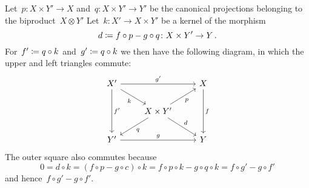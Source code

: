 \section{}

Let~$p \colon X \times Y' \to X$ and~$q \colon X \times Y' \to Y'$ be the canonical projections belonging to the biproduct~$X \otimes Y'$
Let~$k \colon X' \to X \times Y'$ be a kernel of the morphism
\[
            d
  \coloneqq  f \circ p - g \circ q
  \colon    X \times Y'
  \to       Y \,.
\]
For~$f' \coloneqq q \circ k$ and~$g' \coloneqq q \circ k$ we then have the following diagram, in which the upper and left triangles commute:
\[
  \begin{tikzcd}
      X'
      \arrow{rr}[above]{g'}
      \arrow{dr}[below left]{k}
      \arrow{dd}[right]{f'}
    & {}
    & X
      \arrow{dd}[right]{f}
    \\
      {}
    & X \times Y'
      \arrow{ur}[below right]{p}
      \arrow{dr}[above right]{d}
      \arrow{dl}[below right]{q}
    & {}
    \\
      Y'
      \arrow{rr}[above]{g}
    & {}
    & Y
  \end{tikzcd}
\]
The outer square also commutes because
\[
    0
  = d \circ k
  = (f \circ p - g \circ c) \circ k
  = f \circ p \circ k - g \circ q \circ k
  = f \circ g' - g \circ f'
\]
and hence~$f \circ g' - g \circ f'$.

